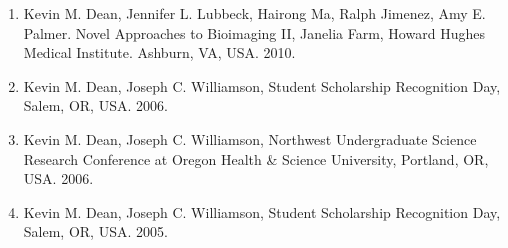 \begin{enumerate}
\item Kevin M. Dean, Jennifer L. Lubbeck, Hairong Ma, Ralph Jimenez, Amy E. Palmer.  Novel Approaches to Bioimaging II, Janelia Farm, Howard Hughes Medical Institute.  Ashburn, VA, USA. 2010.
\item Kevin M. Dean, Joseph C. Williamson, Student Scholarship Recognition Day, Salem, OR, USA. 2006.
\item Kevin M. Dean, Joseph C. Williamson, Northwest Undergraduate Science Research Conference at Oregon Health \& Science University, Portland, OR, USA. 2006.
\item Kevin M. Dean, Joseph C. Williamson, Student Scholarship Recognition Day, Salem, OR, USA. 2005. 
\end{enumerate}